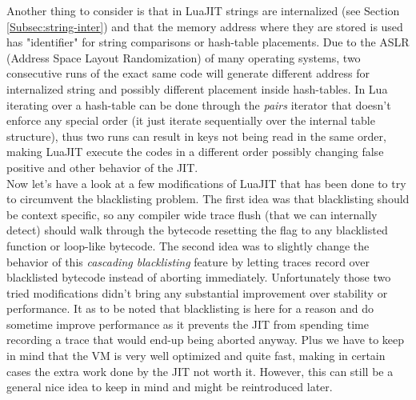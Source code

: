 Another thing to consider is that in LuaJIT strings are internalized (see
Section \ref{Subsec:string-inter}) and that the memory address where they are
stored is used has "identifier" for string comparisons or hash-table placements.
Due to the ASLR (Address Space Layout Randomization) of many operating systems,
two consecutive runs of the exact same code will generate different address for
internalized string and possibly different placement inside hash-tables. In Lua
iterating over a hash-table can be done through the \emph{pairs} iterator that
doesn't enforce any special order (it just iterate sequentially over the internal
table structure), thus two runs can result in keys not being read in the same order,
making LuaJIT execute the codes in a different order possibly changing false positive
and other behavior of the JIT.\\

Now let's have a look at a few modifications of LuaJIT that has been done to try
to circumvent the blacklisting problem. The first idea was that blacklisting
should be context specific, so any compiler wide trace flush (that we can
internally detect) should walk through the bytecode resetting the flag to any
blacklisted function or loop-like bytecode. The second idea was to slightly
change the behavior of this \emph{cascading blacklisting} feature by letting
traces record over blacklisted bytecode instead of aborting immediately.
Unfortunately those two tried modifications didn't bring any substantial
improvement over stability or performance. It as to be noted that
blacklisting is here for a reason and do sometime improve performance as it
prevents the JIT from spending time recording a trace that would end-up being aborted
anyway. Plus we have to keep in mind that the VM is very well optimized and
quite fast, making in certain cases the extra work done by the JIT not worth it.
However, this can still be a general nice idea to keep in mind and might be
reintroduced later.
